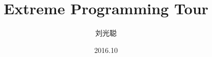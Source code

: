 \title[Extreme Programming Tour]
{Extreme Programming Tour}

\subtitle{}

\author[刘光聪]
{ 刘光聪
}

\institute[]
{
}

\date[2016.10]{2016.10}
